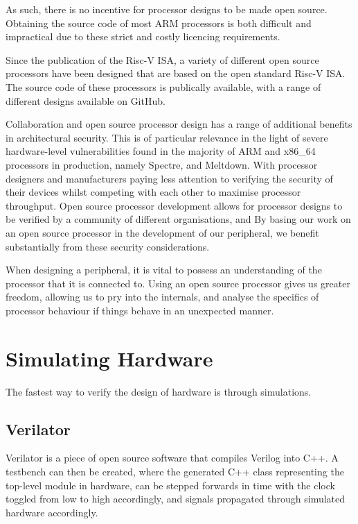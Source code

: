 \documentclass[a4paper,9pt]{report}
\begin{document}
As such, there is no incentive for processor designs to be made open source.
Obtaining the source code of most ARM processors is both difficult and
impractical due to these strict and costly licencing requirements.

Since the publication of the Risc-V ISA, a variety of different open source
processors have been designed that are based on the open standard Risc-V ISA.
The source code of these processors is publically available, with a range of
different designs available on GitHub.

Collaboration and open source processor
design has a range of additional benefits in architectural security. This is of
particular relevance in the light of severe hardware-level vulnerabilities found
in the majority of ARM and x86\_64 processors in production, namely Spectre, and
Meltdown. With processor designers and manufacturers paying less attention to
verifying the security of their devices whilst competing with each other to
maximise processor throughput. Open source processor development allows for
processor designs to be verified by a community of different organisations, and
By basing our work on an open source processor in the development of our
peripheral, we benefit substantially from these security considerations.

When designing a peripheral, it is vital to possess an understanding of the
processor that it is connected to. Using an open source processor gives us
greater freedom, allowing us to pry into the internals, and analyse the
specifics of processor behaviour if things behave in an unexpected manner.


\section{Simulating Hardware}
The fastest way to verify the design of hardware is through simulations.
\subsection{Verilator}
Verilator is a piece of open source software that compiles Verilog into C++. A
testbench can then be created, where the generated C++ class representing the
top-level module in hardware, can be stepped forwards in time with the clock
toggled from low to high accordingly, and signals propagated through simulated
hardware accordingly.
\end{document}
